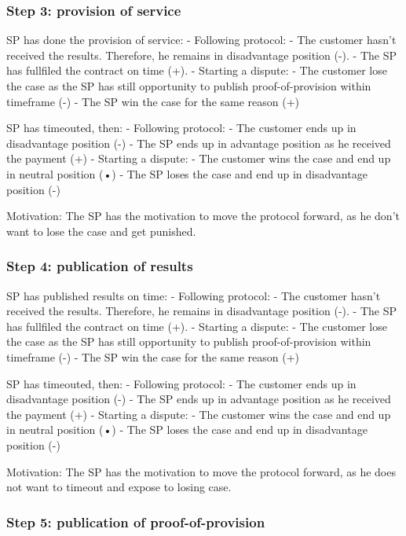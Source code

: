 \documentclass{article}
\begin{document}
\subsubsection{Step 3: provision of service}

SP has done the provision of service:
- Following protocol:
	- The customer hasn't received the results. Therefore, he remains in disadvantage position (-).
	- The SP has fullfiled the contract on time (+).
- Starting a dispute:
	- The customer lose the case as the SP has still opportunity to publish proof-of-provision within timeframe (-)
	- The SP win the case for the same reason (+)

SP has timeouted, then:
- Following protocol:
	- The customer ends up in disadvantage position (-)
	- The SP ends up in advantage position as he received the payment (+)
- Starting a dispute:
	- The customer wins the case and end up in neutral position (•)
	- The SP loses the case and end up in disadvantage position (-)


Motivation:
The SP has the motivation to move the protocol forward, as he don't want to lose the case and get punished.

\subsubsection{Step 4: publication of results}

SP has published results on time:
- Following protocol:
	- The customer hasn't received the results. Therefore, he remains in disadvantage position (-).
	- The SP has fullfiled the contract on time (+).
- Starting a dispute:
	- The customer lose the case as the SP has still opportunity to publish proof-of-provision within timeframe (-)
	- The SP win the case for the same reason (+)

SP has timeouted, then:
- Following protocol:
	- The customer ends up in disadvantage position (-)
	- The SP ends up in advantage position as he received the payment (+)
- Starting a dispute:
	- The customer wins the case and end up in neutral position (•)
	- The SP loses the case and end up in disadvantage position (-)


Motivation:
The SP has the motivation to move the protocol forward, as he does not want to timeout and expose to losing case.

\subsubsection{Step 5: publication of proof-of-provision}
\end{document}
